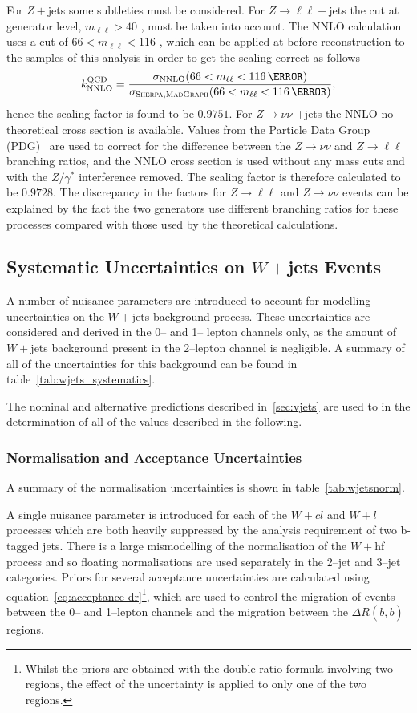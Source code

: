 For $Z+$jets some subtleties must be considered. For $Z\to\ell\ell +$jets the
cut at generator level, $m_{\ell\ell}>40$ \GeV, must be taken into account. The
NNLO calculation uses a cut of $66<m_{\ell\ell}<116$ \GeV, which can be applied
at before reconstruction to the samples of this analysis in order to get the
scaling correct as follows
\begin{equation}
  k_{\text{NNLO}}^{\text{QCD}} =
  \frac{\sigma_{\text{NNLO}}(66<m_{\ell\ell}<116\,{\GeV})}%
  {\sigma_{\textsc{Sherpa},\textsc{MadGraph}}(66<m_{\ell\ell}<116\,{\GeV})},
  \label{eq:nnlo-vjets-k}
\end{equation}
hence the scaling factor is found to be $0.9751$. For $Z \to \nu\nu$ +jets the
NNLO no theoretical cross section is available. Values from the
Particle Data Group (PDG)~\cite{PDG} are used to correct for the difference
between the $Z \to \nu\nu$ and $Z \to \ell\ell$ branching ratios, and the NNLO
cross section is used without any mass cuts and with the $Z/\gamma^*$
interference removed. The scaling factor is therefore calculated to be $0.9728$.
The discrepancy in the factors for $Z\to\ell\ell$ and $Z\to\nu\nu$ events can be
explained by the fact the two generators use different branching ratios for
these processes compared with those used by the theoretical calculations.

\subsection{Systematic Uncertainties on $W+$jets Events}
A number of nuisance parameters are introduced to account for modelling
uncertainties on the $W+$jets background process. These uncertainties are
considered and derived in the 0-- and 1-- lepton channels only, as the amount of
$W+$jets background present in the 2--lepton channel is negligible. A summary of
all of the uncertainties for this background can be found in
table~\ref{tab:wjets_systematics}.

The nominal and alternative predictions described in~\ref{sec:vjets} are used to
in the determination of all of the values described in the following. 

\subsubsection{Normalisation and Acceptance Uncertainties}
A summary of the normalisation uncertainties is shown in
table~\ref{tab:wjetsnorm}.

A single nuisance parameter is introduced for each of the $W+cl$ and $W+l$
processes which are both heavily suppressed by the analysis requirement of two
b-tagged jets. There is a large mismodelling of the normalisation of the $W+$hf
process and so floating normalisations are used separately in the 2--jet and
3--jet categories. Priors for several acceptance uncertainties are calculated
using equation~\ref{eq:acceptance-dr}\footnote{Whilst the priors are obtained
  with the double ratio formula involving two regions, the effect of the
  uncertainty is applied to only one of the two regions.}, which are used to
control the migration of events between the 0-- and 1--lepton channels and the
migration between the $\Delta R(b, \bar{b})$ regions.


